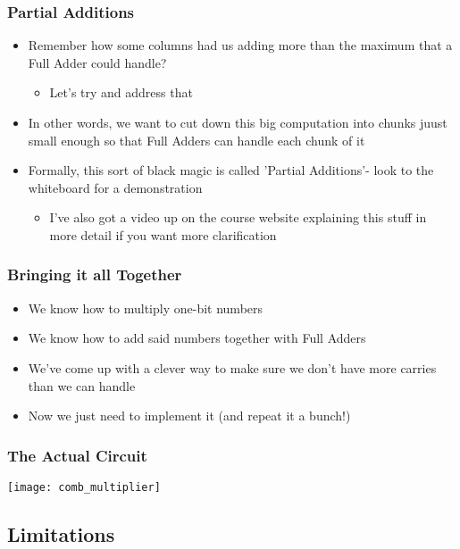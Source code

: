\documentclass{beamer}
\begin{document}
    	\begin{frame}
    		
    			\frametitle{Partial Additions}
    			\begin{itemize}
    				\item Remember how some columns had us adding more than the maximum that a Full Adder could handle? 
    				\begin{itemize}
    					\item Let's try and address that
					\end{itemize}
    				\item In other words, we want to cut down this big computation into chunks juust small enough so that Full Adders can handle each chunk of it
    				\item Formally, this sort of black magic is called 'Partial Additions'- look to the whiteboard for a demonstration
    				\begin{itemize}
    					\item I've also got a video up on the course website explaining this stuff in more detail if you want more clarification
    				\end{itemize}
    			\end{itemize}
    		
    	\end{frame}
    	
    	\begin{frame}
    		\frametitle{Bringing it all Together}
    		\begin{itemize}
    			\item We know how to multiply one-bit numbers
    			\item We know how to add said numbers together with Full Adders
    			\item We've come up with a clever way to make sure we don't have more carries than we can handle
    			\item Now we just need to implement it (and repeat it a bunch!)
    		\end{itemize}
    	\end{frame}
    	
    	\begin{frame}
    		\frametitle{The Actual Circuit}
    		\centering
    		\texttt{[image: comb\_multiplier]}
    	\end{frame}
    	
    	

		\subsection{Limitations}    	
    	
\end{document}
